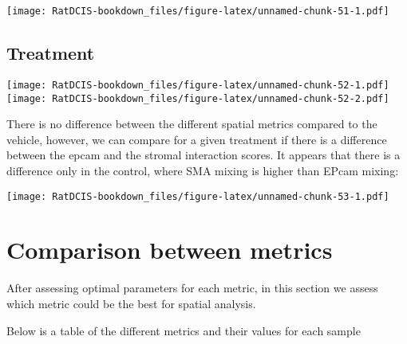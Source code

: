 \documentclass[
]{book}
\begin{document}
\texttt{[image: RatDCIS-bookdown\_files/figure-latex/unnamed-chunk-51-1.pdf]}

\hypertarget{treatment-1}{%
\subsection{Treatment}\label{treatment-1}}

\texttt{[image: RatDCIS-bookdown\_files/figure-latex/unnamed-chunk-52-1.pdf]} \texttt{[image: RatDCIS-bookdown\_files/figure-latex/unnamed-chunk-52-2.pdf]}

There is no difference between the different spatial metrics compared to the vehicle, however, we can compare for a given treatment if there is a difference between the epcam and the stromal interaction scores. It appears that there is a difference only in the control, where SMA mixing is higher than EPcam mixing:

\texttt{[image: RatDCIS-bookdown\_files/figure-latex/unnamed-chunk-53-1.pdf]}

\hypertarget{comparison-between-metrics}{%
\section{Comparison between metrics}\label{comparison-between-metrics}}

After assessing optimal parameters for each metric, in this section we assess which metric could be the best for spatial analysis.

Below is a table of the different metrics and their values for each sample
\end{document}
